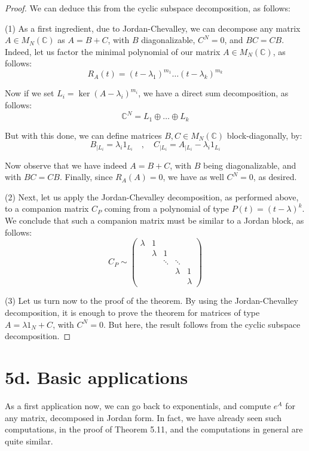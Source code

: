 \documentclass[12pt]{amsbook}
\begin{document}
\begin{proof}
We can deduce this from the cyclic subspace decomposition, as follows:

\medskip

(1) As a first ingredient, due to Jordan-Chevalley, we can decompose any matrix $A\in M_N(\mathbb C)$ as $A=B+C$, with $B$ diagonalizable, $C^N=0$, and $BC=CB$. Indeed, let us factor the minimal polynomial of our matrix $A\in M_N(\mathbb C)$, as follows:
$$R_A(t)=(t-\lambda_1)^{m_1}\ldots(t-\lambda_k)^{m_k}$$

Now if we set $L_i=\ker(A-\lambda_i)^{m_i}$, we have a direct sum decomposition, as follows:
$$\mathbb C^N=L_1\oplus\ldots\oplus L_k$$

But with this done, we can define matrices $B,C\in M_N(\mathbb C)$ block-diagonally, by:
$$B_{|L_i}=\lambda_i1_{L_i}\quad,\quad C_{|L_i}=A_{|L_i}-\lambda_i1_{L_i}$$

Now observe that we have indeed $A=B+C$, with $B$ being diagonalizable, and with $BC=CB$. Finally, since $R_A(A)=0$, we have as well $C^N=0$, as desired.

\medskip

(2) Next, let us apply the Jordan-Chevalley decomposition, as performed above, to a companion matrix $C_P$ coming from a polynomial of type $P(t)=(t-\lambda)^k$. We conclude that such a companion matrix must be similar to a Jordan block, as follows:
$$C_P\sim\begin{pmatrix}
\lambda&1\\
&\lambda&1\\
&&\ddots&\ddots\\
&&&\lambda&1\\
&&&&\lambda
\end{pmatrix}$$

(3) Let us turn now to the proof of the theorem. By using the Jordan-Chevalley decomposition, it is enough to prove the theorem for matrices of type $A=\lambda 1_N+C$, with $C^N=0$. But here, the result follows from the cyclic subspace decomposition.
\end{proof}

\section*{5d. Basic applications} 

As a first application now, we can go back to exponentials, and compute $e^A$ for any matrix, decomposed in Jordan form. In fact, we have already seen such computations, in the proof of Theorem 5.11, and the computations in general are quite similar. 
\end{document}

